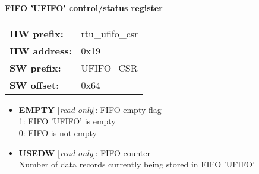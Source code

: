 \paragraph*{FIFO 'UFIFO' control/status register}\vspace{12pt}

\begin{tabular}{l l }
{\bf HW prefix:}  & rtu\_ufifo\_csr\\
{\bf HW address:}  & 0x19\\
{\bf SW prefix:}  & UFIFO\_CSR\\
{\bf SW offset:}  & 0x64\\
\end{tabular}


\vspace{12pt}
\noindent
{}

\begin{itemize}
\item \begin{small}
{\bf 
EMPTY
} [\emph{read-only}]: FIFO empty flag
\\
1: FIFO 'UFIFO' is empty\\0: FIFO is not empty
\end{small}
\item \begin{small}
{\bf 
USEDW
} [\emph{read-only}]: FIFO counter
\\
Number of data records currently being stored in FIFO 'UFIFO'
\end{small}
\end{itemize}
